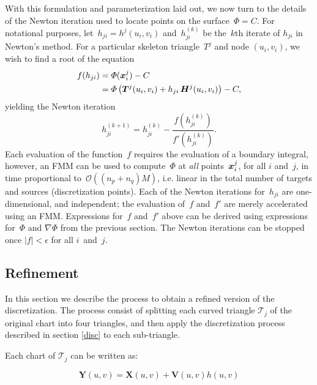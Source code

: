 \documentclass[11pt]{article}
\numberwithin{equation}{section}
\newcommand{\vct}{\vectorsym}
\newcommand{\lp}{\left(}
\newcommand{\rp}{\right)}
\newcommand\bx{\vct{x}}
\newcommand\bX{\boldsymbol X}
\newcommand\bY{\boldsymbol Y}
\newcommand\bV{\boldsymbol V}
\newcommand{\cO}{\mathcal O}
\begin{document}
With this formulation and parameterization laid out, we now turn to
the details of the Newton iteration used to locate points on the
surface~$\Phi = C$.  For notational purposes,
let~$h_{ji} = h^j(u_i,v_i)$ and~$h^{(k)}_{ji}$ be the~$k$th iterate of
$h_{ji}$ in Newton's method. For a particular skeleton triangle~$T^j$
and node $(u_i,v_i)$, we wish to find a root of the equation
\begin{equation}\label{newtoneq}
  \begin{aligned}
    f(h_{ji}) &= \Phi(\bx^j_i) - C \\
    &= \Phi\lp \vct{T}^j(u_i,v_i) + h_{ji} \, \vct{H}^j(u_i,v_i)
    \rp - C,
\end{aligned}
\end{equation}
yielding the Newton iteration
\begin{equation}
  h_{ji}^{(k+1)} = h_{ji}^{(k)} - \frac{ f\lp h_{ji}^{(k)} \rp}
{f'\lp h_{ji}^{(k)} \rp}.
\end{equation}
Each evaluation of the function~$f$ requires the evaluation of a
boundary integral, however, an FMM can be used to compute~$\Phi$ at
\emph{all} points~$\bx^j_i$, for all $i$ and~$j$, in time proportional
to~$\cO \lp (n_p+n_q)M \rp$, i.e. linear in the total number of
targets and sources (discretization points).  Each of the Newton
iterations for~$h_{ji}$ are one-dimensional, and independent; the
evaluation of~$f$ and~$f'$ are merely accelerated using an
FMM. Expressions for~$f$ and~$f'$ above can be derived using
expressions for~$\Phi$ and $\nabla \Phi$ from the previous section.
The Newton iterations can be stopped once $|f| < \epsilon$ for all
$i$~and~$j$.





\subsection{Refinement}

In this section we describe the process to obtain a refined version of the discretization. The process consist of splitting each curved triangle  $\mathcal{T}_j$ of the original chart into four triangles, and then apply the discretization process described in section \ref{disc} to each sub-triangle.

Each chart of $\mathcal{T}_j$ can be written as:

\begin{equation}
\bY(u,v)=\bX(u,v)+\bV(u,v)h(u,v)
\end{equation}
\end{document}
